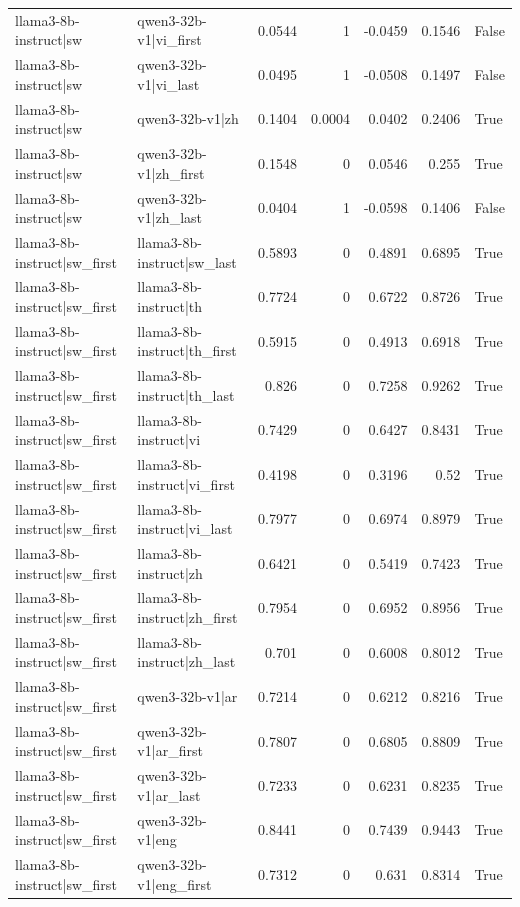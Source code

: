 \begin{table}
\begin{tabular}{l l r r r r l}
llama3-8b-instruct|sw & qwen3-32b-v1|vi_first & 0.0544 & 1 & -0.0459 & 0.1546 & False \\
llama3-8b-instruct|sw & qwen3-32b-v1|vi_last & 0.0495 & 1 & -0.0508 & 0.1497 & False \\
llama3-8b-instruct|sw & qwen3-32b-v1|zh & 0.1404 & 0.0004 & 0.0402 & 0.2406 & True \\
llama3-8b-instruct|sw & qwen3-32b-v1|zh_first & 0.1548 & 0 & 0.0546 & 0.255 & True \\
llama3-8b-instruct|sw & qwen3-32b-v1|zh_last & 0.0404 & 1 & -0.0598 & 0.1406 & False \\
llama3-8b-instruct|sw_first & llama3-8b-instruct|sw_last & 0.5893 & 0 & 0.4891 & 0.6895 & True \\
llama3-8b-instruct|sw_first & llama3-8b-instruct|th & 0.7724 & 0 & 0.6722 & 0.8726 & True \\
llama3-8b-instruct|sw_first & llama3-8b-instruct|th_first & 0.5915 & 0 & 0.4913 & 0.6918 & True \\
llama3-8b-instruct|sw_first & llama3-8b-instruct|th_last & 0.826 & 0 & 0.7258 & 0.9262 & True \\
llama3-8b-instruct|sw_first & llama3-8b-instruct|vi & 0.7429 & 0 & 0.6427 & 0.8431 & True \\
llama3-8b-instruct|sw_first & llama3-8b-instruct|vi_first & 0.4198 & 0 & 0.3196 & 0.52 & True \\
llama3-8b-instruct|sw_first & llama3-8b-instruct|vi_last & 0.7977 & 0 & 0.6974 & 0.8979 & True \\
llama3-8b-instruct|sw_first & llama3-8b-instruct|zh & 0.6421 & 0 & 0.5419 & 0.7423 & True \\
llama3-8b-instruct|sw_first & llama3-8b-instruct|zh_first & 0.7954 & 0 & 0.6952 & 0.8956 & True \\
llama3-8b-instruct|sw_first & llama3-8b-instruct|zh_last & 0.701 & 0 & 0.6008 & 0.8012 & True \\
llama3-8b-instruct|sw_first & qwen3-32b-v1|ar & 0.7214 & 0 & 0.6212 & 0.8216 & True \\
llama3-8b-instruct|sw_first & qwen3-32b-v1|ar_first & 0.7807 & 0 & 0.6805 & 0.8809 & True \\
llama3-8b-instruct|sw_first & qwen3-32b-v1|ar_last & 0.7233 & 0 & 0.6231 & 0.8235 & True \\
llama3-8b-instruct|sw_first & qwen3-32b-v1|eng & 0.8441 & 0 & 0.7439 & 0.9443 & True \\
llama3-8b-instruct|sw_first & qwen3-32b-v1|eng_first & 0.7312 & 0 & 0.631 & 0.8314 & True \\

\end{tabular}
\end{table}
